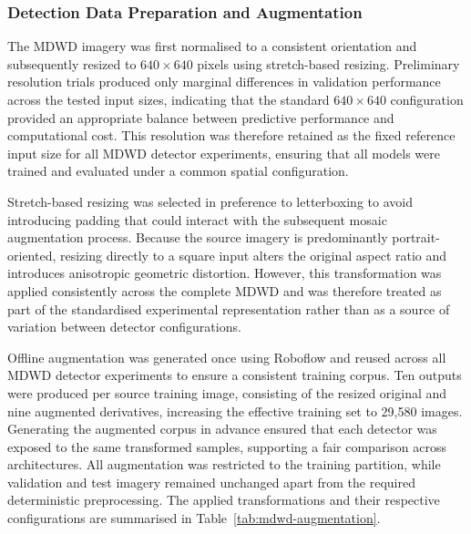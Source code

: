 \subsubsection{ Detection Data Preparation and Augmentation}
\label{sec:md-augmentation-mdwd}
The \gls{MDWD} imagery was first normalised to a consistent orientation and subsequently resized to \(640 \times 640\) pixels using stretch-based resizing. Preliminary resolution trials produced only marginal differences in validation performance across the tested input sizes, indicating that the standard \(640 \times 640\) configuration provided an appropriate balance between predictive performance and computational cost. This resolution was therefore retained as the fixed reference input size for all \gls{MDWD} detector experiments, ensuring that all models were trained and evaluated under a common spatial configuration.

Stretch-based resizing was selected in preference to letterboxing to avoid introducing padding that could interact with the subsequent mosaic augmentation process. Because the source imagery is predominantly portrait-oriented, resizing directly to a square input alters the original aspect ratio and introduces anisotropic geometric distortion. However, this transformation was applied consistently across the complete \gls{MDWD} and was therefore treated as part of the standardised experimental representation rather than as a source of variation between detector configurations.

Offline augmentation was generated once using Roboflow and reused across all \gls{MDWD} detector experiments to ensure a consistent training corpus. Ten outputs were produced per source training image, consisting of the resized original and nine augmented derivatives, increasing the effective training set to 29,580 images. Generating the augmented corpus in advance ensured that each detector was exposed to the same transformed samples, supporting a fair comparison across architectures. All augmentation was restricted to the training partition, while validation and test imagery remained unchanged apart from the required deterministic preprocessing. The applied transformations and their respective configurations are summarised in Table~\ref{tab:mdwd-augmentation}.

